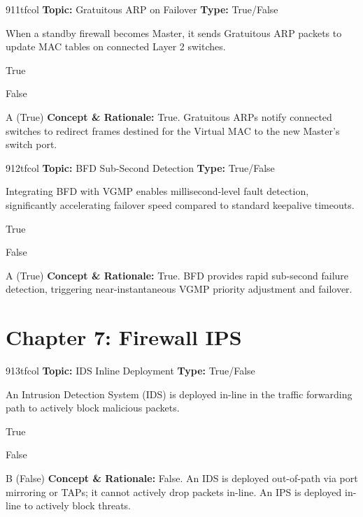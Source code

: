 \begin{qcard}{911}{tfcol}
\textcolor{darkslate!75}{\small\textbf{Topic:} Gratuitous ARP on Failover \hfill \textbf{Type:} True/False}\vspace{0.4em}\par
When a standby firewall becomes Master, it sends Gratuitous ARP packets to update MAC tables on connected Layer 2 switches.
\begin{qoptions}
\item True
\item False
\end{qoptions}
\end{qcard}
\nopagebreak
\begin{explainbox}{A (True)}
\textbf{Concept \& Rationale:} True. Gratuitous ARPs notify connected switches to redirect frames destined for the Virtual MAC to the new Master's switch port.
\end{explainbox}

\begin{qcard}{912}{tfcol}
\textcolor{darkslate!75}{\small\textbf{Topic:} BFD Sub-Second Detection \hfill \textbf{Type:} True/False}\vspace{0.4em}\par
Integrating BFD with VGMP enables millisecond-level fault detection, significantly accelerating failover speed compared to standard keepalive timeouts.
\begin{qoptions}
\item True
\item False
\end{qoptions}
\end{qcard}
\nopagebreak
\begin{explainbox}{A (True)}
\textbf{Concept \& Rationale:} True. BFD provides rapid sub-second failure detection, triggering near-instantaneous VGMP priority adjustment and failover.
\end{explainbox}

\section{Chapter 7: Firewall IPS}

\begin{qcard}{913}{tfcol}
\textcolor{darkslate!75}{\small\textbf{Topic:} IDS Inline Deployment \hfill \textbf{Type:} True/False}\vspace{0.4em}\par
An Intrusion Detection System (IDS) is deployed in-line in the traffic forwarding path to actively block malicious packets.
\begin{qoptions}
\item True
\item False
\end{qoptions}
\end{qcard}
\nopagebreak
\begin{explainbox}{B (False)}
\textbf{Concept \& Rationale:} False. An IDS is deployed out-of-path via port mirroring or TAPs; it cannot actively drop packets in-line. An IPS is deployed in-line to actively block threats.
\end{explainbox}

